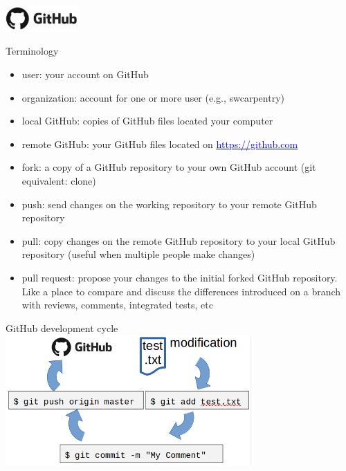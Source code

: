 \begin{frame}{\includegraphics[height=1cm]{shared/logo-github.png} }
\begin{block}{Terminology}
\begin{itemize}
    \item user: your account on GitHub
    \item organization: account for one or more user (e.g., swcarpentry)
    \item local GitHub: copies of GitHub files located your computer
    \item remote GitHub: your GitHub files located on \href{https://github.com}{\textcolor{blue}{\underline{https://github.com}}}
    \item fork: a copy of a GitHub repository to your own GitHub account (git equivalent: clone)
    \item push: send changes on the working repository to your remote GitHub repository
    \item pull: copy changes on the remote GitHub repository to your local GitHub repository (useful when multiple people make changes)
    \item pull request: propose your changes to the initial forked GitHub repository. Like a place to compare and discuss the differences introduced on a branch with reviews, comments, integrated tests, etc
\end{itemize}
\end{block}
\end{frame}



\begin{frame}{GitHub development cycle}
\includegraphics[height=5cm]{05_history/Images/FAIR_github_devCycle.png}
\end{frame}
